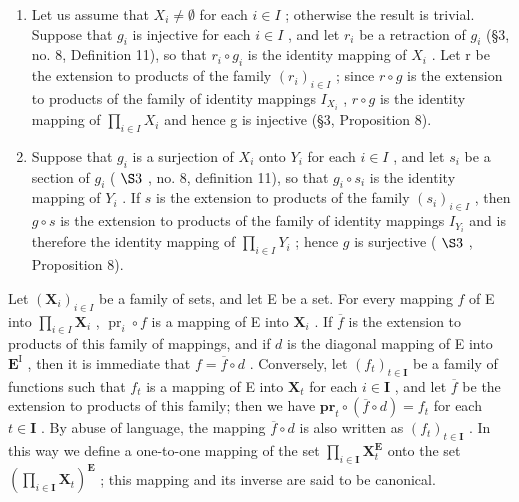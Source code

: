 \begin{enumerate}
\def\labelenumi{(\arabic{enumi})}
\item
  Let us assume that \(X_{i} \neq \emptyset\) for each \(i \in I\) ; otherwise the result is trivial. Suppose that \(g_{i}\) is injective for each \(i \in I\) , and let \(r_{i}\) be a retraction of \(g_{i}\) (§3, no. 8, Definition 11), so that \(r_{i} \circ g_{i}\) is the identity mapping of \(X_{i}\) . Let r be the extension to products of the family \((r_{i})_{i \in I}\) ; since \(r \circ g\) is the extension to products of the family of identity mappings \(I_{X_{i}}\) , \(r \circ g\) is the identity mapping of \(\prod_{i \in I} X_{i}\) and hence g is injective (§3, Proposition 8).
\item
  Suppose that \(g_{i}\) is a surjection of \(X_{i}\) onto \(Y_{i}\) for each \(i \in I\) , and let \(s_{i}\) be a section of \(g_{i}\) ( \(\S 3\) , no. 8, definition 11), so that \(g_{i} \circ s_{i}\) is the identity mapping of \(Y_{i}\) . If \(s\) is the extension to products of the family \((s_{i})_{i \in I}\) , then \(g \circ s\) is the extension to products of the family of identity mappings \(I_{Y_{i}}\) and is therefore the identity mapping of \(\prod_{i \in I} Y_{i}\) ; hence \(g\) is surjective ( \(\S 3\) , Proposition 8).
\end{enumerate}

Let \((\mathbf{X}_i)_{i\in I}\) be a family of sets, and let E be a set. For every mapping \(f\) of E into \(\prod_{i\in I} \mathbf{X}_i\) , \(\operatorname{pr}_i \circ f\) is a mapping of E into \(\mathbf{X}_i\) . If \(\overline{f}\) is the extension to products of this family of mappings, and if \(d\) is the diagonal mapping of E into \(\mathbf{E}^{\mathrm{I}}\) , then it is immediate that \(f = \overline{f} \circ d\) . Conversely, let \((f_{t})_{t \in \mathbf{I}}\) be a family of functions such that \(f_{t}\) is a mapping of E into \(\mathbf{X}_{t}\) for each \(i \in \mathbf{I}\) , and let \(\overline{f}\) be the extension to products of this family; then we have \(\mathbf{pr}_{t} \circ (\overline{f} \circ d) = f_{t}\) for each \(t \in \mathbf{I}\) . By abuse of language, the mapping \(\overline{f} \circ d\) is also written as \((f_{t})_{t \in \mathbf{I}}\) . In this way we define a one-to-one mapping of the set \(\prod_{i \in \mathbf{I}} \mathbf{X}_{t}^{\mathbf{E}}\) onto the set \(\left(\prod_{i \in \mathbf{I}} \mathbf{X}_{t}\right)^{\mathbf{E}}\) ; this mapping and its inverse are said to be canonical.

